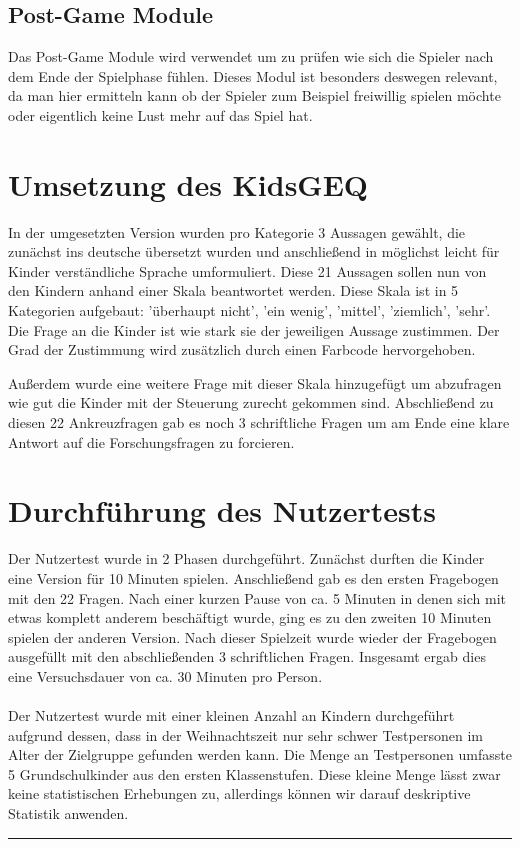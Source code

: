 \subsection{Post-Game Module}
Das Post-Game Module wird verwendet um zu prüfen wie sich die Spieler nach dem Ende der Spielphase fühlen. Dieses Modul ist besonders deswegen relevant, da man hier ermitteln kann ob der Spieler zum Beispiel freiwillig spielen möchte oder eigentlich keine Lust mehr auf das Spiel hat.
\section{Umsetzung des KidsGEQ}
In der umgesetzten Version wurden pro Kategorie 3 Aussagen gewählt, die zunächst ins deutsche übersetzt wurden und anschließend in möglichst leicht für Kinder verständliche Sprache umformuliert. Diese 21 Aussagen sollen nun von den Kindern anhand einer Skala beantwortet werden. Diese Skala ist in 5 Kategorien aufgebaut: 'überhaupt nicht', 'ein wenig', 'mittel', 'ziemlich', 'sehr'. Die Frage an die Kinder ist wie stark sie der jeweiligen Aussage zustimmen. Der Grad der Zustimmung wird zusätzlich durch einen Farbcode hervorgehoben. 


Außerdem wurde eine weitere Frage mit dieser Skala hinzugefügt um abzufragen wie gut die Kinder mit der Steuerung zurecht gekommen sind. Abschließend zu diesen 22 Ankreuzfragen gab es noch 3 schriftliche Fragen um am Ende eine klare Antwort auf die Forschungsfragen zu forcieren. %
\section{Durchführung des Nutzertests} %
Der Nutzertest wurde in 2 Phasen durchgeführt. Zunächst durften die Kinder eine Version für 10 Minuten spielen. Anschließend gab es den ersten Fragebogen mit den 22 Fragen. Nach einer kurzen Pause von ca. 5 Minuten in denen sich mit etwas komplett anderem beschäftigt wurde, ging es zu den zweiten 10 Minuten spielen der anderen Version. Nach dieser Spielzeit wurde wieder der Fragebogen ausgefüllt mit den abschließenden 3 schriftlichen Fragen. Insgesamt ergab dies eine Versuchsdauer von ca. 30 Minuten pro Person.\\
\\
Der Nutzertest wurde mit einer kleinen Anzahl an Kindern durchgeführt aufgrund dessen, dass in der Weihnachtszeit nur sehr schwer Testpersonen im Alter der Zielgruppe gefunden werden kann. Die Menge an Testpersonen umfasste 5 Grundschulkinder aus den ersten Klassenstufen. Diese kleine Menge lässt zwar keine statistischen Erhebungen zu, allerdings können wir darauf deskriptive Statistik anwenden. 

\hfil\rule{0.4\textwidth}{0.4pt}
